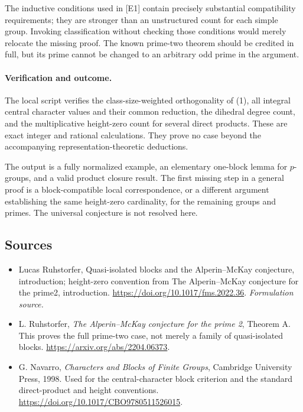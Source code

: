 \documentclass[11pt]{article}
\begin{document}
The inductive conditions used in [E1] contain precisely substantial compatibility requirements; they are stronger than an unstructured count for each simple group. Invoking classification without checking those conditions would merely relocate the missing proof. The known prime-two theorem should be credited in full, but its prime cannot be changed to an arbitrary odd prime in the argument.

\paragraph{Verification and outcome.}
The local script verifies the class-size-weighted orthogonality of (1), all integral central character values and their common reduction, the dihedral degree count, and the multiplicative height-zero count for several direct products. These are exact integer and rational calculations. They prove no case beyond the accompanying representation-theoretic deductions.

The output is a fully normalized example, an elementary one-block lemma for $p$-groups, and a valid product closure result. The first missing step in a general proof is a block-compatible local correspondence, or a different argument establishing the same height-zero cardinality, for the remaining groups and primes. The universal conjecture is not resolved here.

\subsection{Sources}
\begin{itemize}
\item[S1]Lucas Ruhstorfer, Quasi-isolated blocks and the Alperin–McKay conjecture, introduction; height-zero convention from The Alperin–McKay conjecture for the prime2, introduction.
\url{https://doi.org/10.1017/fms.2022.36}.
\textit{Formulation source.}
\item[E1]L. Ruhstorfer, \textit{The Alperin--McKay conjecture for the prime 2}, Theorem A. This proves the full prime-two case, not merely a family of quasi-isolated blocks.
\url{https://arxiv.org/abs/2204.06373}.
\item[E2]G. Navarro, \textit{Characters and Blocks of Finite Groups}, Cambridge University Press, 1998. Used for the central-character block criterion and the standard direct-product and height conventions.
\url{https://doi.org/10.1017/CBO9780511526015}.

\end{itemize}
\end{document}
